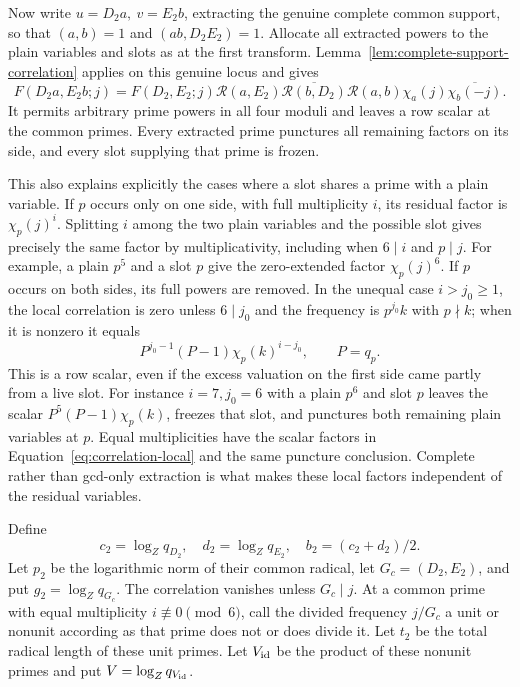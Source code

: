 \documentclass[11pt,a4paper]{article}
\numberwithin{equation}{section}
\numberwithin{figure}{section}
\theoremstyle{definition}
\theoremstyle{remark}
\begin{document}
Now write \(u=D_2a,\ v=E_2b\), extracting the genuine complete
common support, so that \((a,b)=1\) and \((ab,D_2E_2)=1\).
Allocate all extracted powers to the plain variables and slots as at the
first transform.  Lemma~\ref{lem:complete-support-correlation} applies on
this genuine locus and gives
\[
 F(D_2a,E_2b;j)=F(D_2,E_2;j)\mathcal R(a,E_2)
   \overline{\mathcal R(b,D_2)}\mathcal R(a,b)
   \chi_a(j)\overline{\chi_b(-j)}.
\]
It permits arbitrary prime powers in all four moduli and leaves a row
scalar at the common primes.  Every extracted prime punctures all
remaining factors on its side, and every slot supplying that prime is
frozen.

This also explains explicitly the cases where a slot shares a
prime with a plain variable.  If \(p\) occurs only on one side, with
full multiplicity \(i\), its residual factor is
\(\chi_p(j)^i\).  Splitting \(i\) among the two plain variables and
the possible slot gives precisely the same factor by multiplicativity,
including when \(6\mid i\) and \(p\mid j\).  For example, a plain
\(p^5\) and a slot \(p\) give the zero-extended factor
\(\chi_p(j)^6\).  If \(p\) occurs on both sides, its full powers are
removed.  In the unequal case \(i>j_0\ge1\), the local correlation
is zero unless \(6\mid j_0\) and the frequency is \(p^{j_0}k\)
with \(p\nmid k\); when it is nonzero it equals
\[
 P^{j_0-1}(P-1)\chi_p(k)^{i-j_0},\qquad P=q_p.
\]
This is a row scalar, even if the excess valuation on the first side
came partly from a live slot.  For instance \(i=7,j_0=6\) with a
plain \(p^6\) and slot \(p\) leaves the scalar
\(P^5(P-1)\chi_p(k)\), freezes that slot, and punctures both
remaining plain variables at \(p\).  Equal multiplicities have the
scalar factors in Equation~\eqref{eq:correlation-local} and the
same puncture conclusion.  Complete rather than gcd-only extraction
is what makes these local factors independent of the residual
variables.

Define
\[
 c_2=\log_Zq_{D_2},\quad d_2=\log_Zq_{E_2},\quad
 b_2=(c_2+d_2)/2.
\]
Let \(p_2\) be the logarithmic norm of their common radical,
let \(G_c=(D_2,E_2)\), and put \(g_2=\log_Zq_{G_c}\).
The correlation vanishes unless \(G_c\mid j\).  At a common
prime with equal multiplicity \(i\not\equiv0\pmod6\), call the
divided frequency \(j/G_c\) a unit or nonunit according as that
prime does not or does divide it.  Let \(t_2\) be the total
radical length of these unit primes.  Let \(V_{\rm id}\) be
the product of these nonunit primes and put
\(V=\log_Zq_{V_{\rm id}}\).
\end{document}
